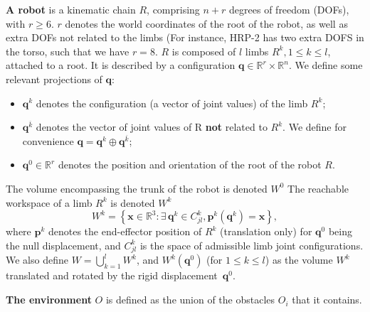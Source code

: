 \medskip
\textbf{A robot} is a kinematic chain $R$, comprising \mbox{$n + r$} degrees of freedom (DOFs), with $r \geq 6$. $r$ denotes the world coordinates of the root of the robot,
as well as extra DOFs not related to the limbs (For instance, HRP-2 has two extra DOFS in the torso, such that we have $r=8$. 
$R$ is composed of $l$ limbs $R^k, 1 \leq k \leq l$, attached to a root.
It is described by a configuration $\mathbf{q} \in  \mathbb{R}^r \times \mathbb{R}^n$.
We define some relevant projections of $\mathbf{q}$:
\begin{itemize}
	\item $\mathbf{q}^k$ denotes the configuration (a vector of joint values) of the limb $R^k$; %
	\item $\mathbf{q}^{\overline{k}}$ denotes the vector of joint values of R \textbf{not} related to $R^k$. We define for convenience \mbox{$\mathbf{q}= \mathbf{q}^k \oplus \mathbf{q}^{\overline{k}}$}; %
	\item $\mathbf{q}^{0}\in \mathbb{R}^r$ denotes the position and orientation of the root of the robot $R$.
\end{itemize}

\medskip
The volume encompassing the trunk of the robot is denoted $W^0$
 The reachable workspace of a limb $R^k$ is denoted $W^k$ %
\begin{equation}
  W^k = \left\{ {\mathbf{x} \in \mathbb{R}^3: \exists \, \mathbf{q}^k \in C^k_{jl}, \mathbf{p}^k(\mathbf{q}^k) = \mathbf{x} } \right\},
\end{equation}
where $\mathbf{p}^k$ denotes the end-effector position of $R^k$ (translation only) for $\mathbf{q}^0$ being the null displacement, and  $C^k_{jl}$ is the space
of admissible limb joint configurations. We also define $W = \bigcup_{k=1}^{l}W^k$, and
$W^k(\mathbf{q}^{0})$ (for $1 \leq k \leq l$) as the volume $W^k$ translated and rotated by the rigid displacement~$\mathbf{q}^{0}$.

\medskip
\textbf{The environment} $O$ is defined as the union of the obstacles $O_i$ that it contains.
